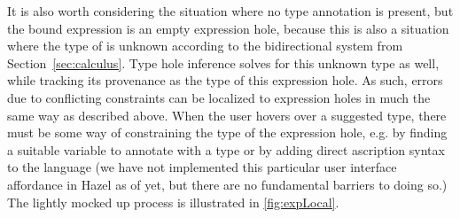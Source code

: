 
It is also worth considering the situation where no type annotation is present, but the bound expression is an empty expression hole, because this is also a situation where the type of  is unknown according to the bidirectional system from Section~\ref{sec:calculus}. Type hole inference solves for this unknown type as well, while tracking its provenance as the type of this expression hole. As such, errors due to conflicting constraints can be localized to expression holes in much the same way as described above. When the user hovers over a suggested type, there must be some way of constraining the type of the expression hole, e.g. by finding a suitable variable to annotate with a type or by adding direct ascription syntax to the language (we have not implemented this particular user interface affordance in Hazel as of yet, but there are no fundamental barriers to doing so.) The lightly mocked up process is illustrated in \cref{fig:expLocal}.

